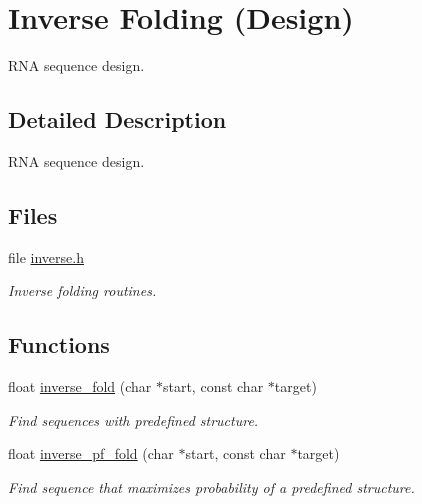 \hypertarget{group__inverse__fold}{}\section{Inverse Folding (Design)}
\label{group__inverse__fold}


R\+NA sequence design.  




\subsection{Detailed Description}
R\+NA sequence design. 

\subsection*{Files}
\begin{DoxyCompactItemize}
\item 
file \hyperlink{inverse_8h}{inverse.\+h}
\begin{DoxyCompactList}\small\item\em Inverse folding routines. \end{DoxyCompactList}\end{DoxyCompactItemize}
\subsection*{Functions}
\begin{DoxyCompactItemize}
\item 
float \hyperlink{group__inverse__fold_ga7af026de55d4babad879f2c92559cbbc}{inverse\+\_\+fold} (char $\ast$start, const char $\ast$target)
\begin{DoxyCompactList}\small\item\em Find sequences with predefined structure. \end{DoxyCompactList}\item 
float \hyperlink{group__inverse__fold_gaeef52ecbf2a2450ad585a344f9826806}{inverse\+\_\+pf\+\_\+fold} (char $\ast$start, const char $\ast$target)
\begin{DoxyCompactList}\small\item\em Find sequence that maximizes probability of a predefined structure. \end{DoxyCompactList}\end{DoxyCompactItemize}
